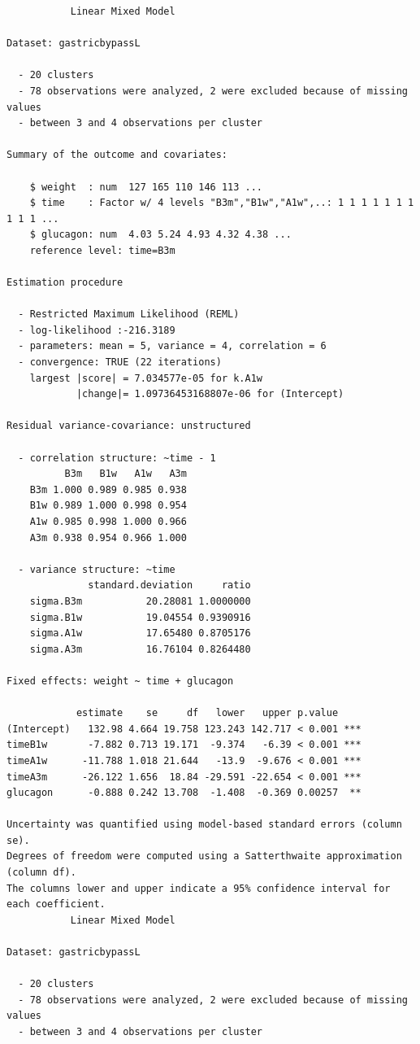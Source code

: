 \documentclass[12pt]{article}
\begin{document}
\begin{verbatim}
           Linear Mixed Model 
 
Dataset: gastricbypassL 

  - 20 clusters 
  - 78 observations were analyzed, 2 were excluded because of missing values 
  - between 3 and 4 observations per cluster 

Summary of the outcome and covariates: 

    $ weight  : num  127 165 110 146 113 ...
    $ time    : Factor w/ 4 levels "B3m","B1w","A1w",..: 1 1 1 1 1 1 1 1 1 1 ...
    $ glucagon: num  4.03 5.24 4.93 4.32 4.38 ...
    reference level: time=B3m 

Estimation procedure 

  - Restricted Maximum Likelihood (REML) 
  - log-likelihood :-216.3189
  - parameters: mean = 5, variance = 4, correlation = 6
  - convergence: TRUE (22 iterations) 
    largest |score| = 7.034577e-05 for k.A1w
            |change|= 1.09736453168807e-06 for (Intercept)
 
Residual variance-covariance: unstructured 

  - correlation structure: ~time - 1 
          B3m   B1w   A1w   A3m
    B3m 1.000 0.989 0.985 0.938
    B1w 0.989 1.000 0.998 0.954
    A1w 0.985 0.998 1.000 0.966
    A3m 0.938 0.954 0.966 1.000

  - variance structure: ~time 
              standard.deviation     ratio
    sigma.B3m           20.28081 1.0000000
    sigma.B1w           19.04554 0.9390916
    sigma.A1w           17.65480 0.8705176
    sigma.A3m           16.76104 0.8264480

Fixed effects: weight ~ time + glucagon 

            estimate    se     df   lower   upper p.value    
(Intercept)   132.98 4.664 19.758 123.243 142.717 < 0.001 ***
timeB1w       -7.882 0.713 19.171  -9.374   -6.39 < 0.001 ***
timeA1w      -11.788 1.018 21.644   -13.9  -9.676 < 0.001 ***
timeA3m      -26.122 1.656  18.84 -29.591 -22.654 < 0.001 ***
glucagon      -0.888 0.242 13.708  -1.408  -0.369 0.00257  **

Uncertainty was quantified using model-based standard errors (column se). 
Degrees of freedom were computed using a Satterthwaite approximation (column df). 
The columns lower and upper indicate a 95% confidence interval for each coefficient.
           Linear Mixed Model 
 
Dataset: gastricbypassL 

  - 20 clusters 
  - 78 observations were analyzed, 2 were excluded because of missing values 
  - between 3 and 4 observations per cluster 


\end{verbatim}
\end{document}

